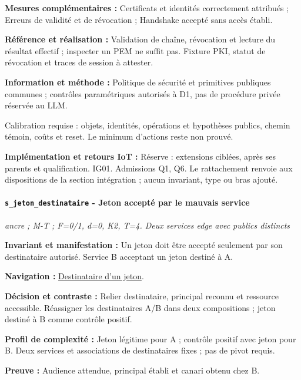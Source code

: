 \documentclass[11pt,a4paper]{article}
\newcommand{\comparisonlink}[2]{\hyperlink{comparison:#1}{#2}}
\begin{document}
\textbf{Mesures complémentaires :} Certificats et identités correctement attribués ; Erreurs de validité et de révocation ; Handshake accepté sans accès établi.

\textbf{Référence et réalisation :} Validation de chaîne, révocation et lecture du résultat effectif ; inspecter un PEM ne suffit pas. Fixture PKI, statut de révocation et traces de session à attester.

\textbf{Information et méthode :} Politique de sécurité et primitives publiques communes ; contrôles paramétriques autorisés à D1, pas de procédure privée réservée au LLM.

Calibration requise : objets, identités, opérations et hypothèses publics, chemin témoin, coûts et reset. Le minimum d’actions reste non prouvé.

\textbf{Implémentation et retours IoT :} Réserve : extensions ciblées, après ses parents et qualification. IG01. Admissions Q1, Q6. Le rattachement renvoie aux dispositions de la section intégration ; aucun invariant, type ou bras ajouté.

\par\noindent\begin{minipage}{\linewidth}\setlength{\parskip}{5pt}\paragraph{\texttt{s\_jeton\_destinataire} - Jeton accepté par le mauvais service}\label{scenario:s_jeton_destinataire}
\textit{ancre ; M-T ; F=0/1, d=0, K2, T=4. Deux services edge avec publics distincts}

\textbf{Invariant et manifestation :} Un jeton doit être accepté seulement par son destinataire autorisé. Service B acceptant un jeton destiné à A.\par\end{minipage}\par


\textbf{Navigation :} \comparisonlink{E18}{Destinataire d’un jeton}.

\textbf{Décision et contraste :} Relier destinataire, principal reconnu et ressource accessible. Réassigner les destinataires A/B dans deux compositions ; jeton destiné à B comme contrôle positif.

\textbf{Profil de complexité :} Jeton légitime pour A ; contrôle positif avec jeton pour B. Deux services et associations de destinataires fixes ; pas de pivot requis.

\textbf{Preuve :} Audience attendue, principal établi et canari obtenu chez B.
\end{document}
